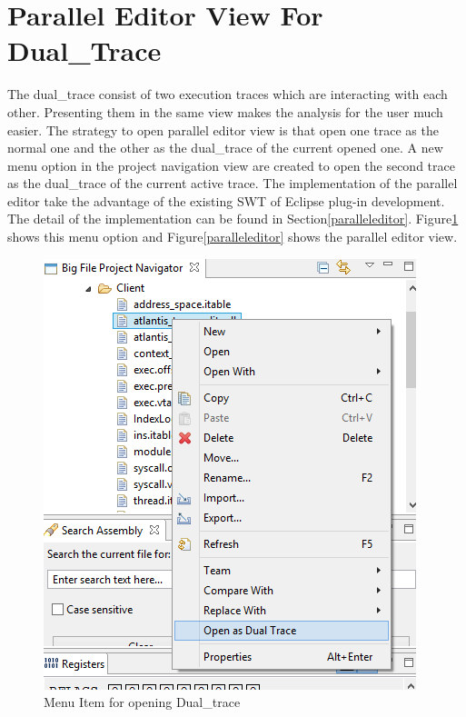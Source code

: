 \section{Parallel Editor View For Dual\_Trace}
The dual\_trace consist of two execution traces which are interacting with each other. Presenting them in the same view makes the analysis for the user much easier. The strategy to open parallel editor view is that open one trace as the normal one and the other as the dual\_trace of the current opened one. A new menu option in the project navigation view are created to open the second trace as the dual\_trace of the current active trace. The implementation of the parallel editor take the advantage of the existing SWT of Eclipse plug-in development. The detail of the implementation can be found in Section\ref{paralleleditor}. Figure\ref{opendualtracemenu} shows this menu option and Figure\ref{paralleleditor} shows the parallel editor view.

\begin{figure}[H]
\centerline{\includegraphics[scale=0.7]{Figures/opendualtracemenu}}
 \caption{Menu Item for opening Dual\_trace}
\label{opendualtracemenu}
\end{figure}

